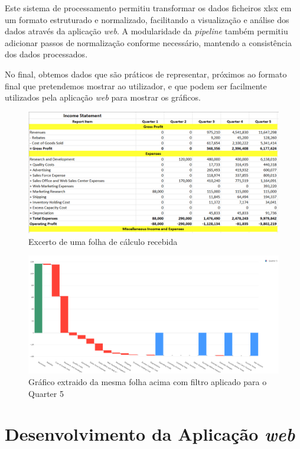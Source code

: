 Este sistema de processamento permitiu transformar os dados ficheiros \gls{xlsx} em um formato estruturado e normalizado, facilitando a visualização e análise dos dados através da aplicação \textit{web}. A modularidade da \textit{pipeline} também permitiu adicionar passos de normalização conforme necessário, mantendo a consistência dos dados processados.

No final, obtemos dados que são práticos de representar, próximos ao formato final que pretendemos mostrar ao utilizador, e que podem ser facilmente utilizados pela aplicação \textit{web} para mostrar os gráficos.

\begin{figure}[H]
\centering
\includegraphics[max width=\textwidth]{./img/before}
\caption{Excerto de uma folha de cálculo recebida}
\end{figure}

\begin{figure}[H]
\centering
\includegraphics[max width=\textwidth]{./img/after}
\caption{Gráfico extraido da mesma folha acima com filtro aplicado para o Quarter 5}
\end{figure}

\section{Desenvolvimento da Aplicação \textit{web}}

